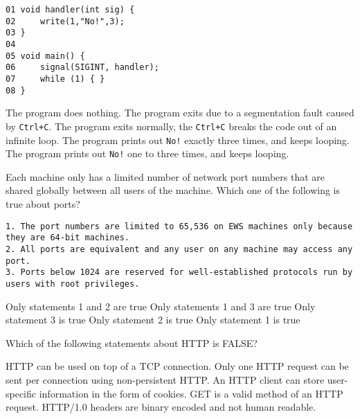 \begin{verbatim}
01 void handler(int sig) {
02     write(1,"No!",3);
03 }
04 
05 void main() {
06     signal(SIGINT, handler);
07     while (1) { }
08 }
\end{verbatim}

\begin{answers}

\answer The program does nothing.
\answer The program exits due to a segmentation fault caused by {\tt Ctrl+C}.
\answer The program exits normally, the {\tt Ctrl+C} breaks the code out of an infinite loop.
\answer The program prints out {\tt No!} exactly three times, and keeps looping.
\correctanswer The program prints out {\tt No!} one to three times, and keeps looping. 
\end{answers}
\begin{solution}
\end{solution}


\variant
Each machine only has a limited number of network port numbers that are shared globally between all users of the machine.  Which one of the following is true about ports?
\begin{verbatim}
1. The port numbers are limited to 65,536 on EWS machines only because they are 64-bit machines.
2. All ports are equivalent and any user on any machine may access any port.
3. Ports below 1024 are reserved for well-established protocols run by users with root privileges.
\end{verbatim}
\begin{answers}
\answer Only statements 1 and 2 are true
\answer Only statements 1 and 3 are true
\correctanswer Only statement 3 is true
\answer Only statement 2 is true
\answer Only statement 1 is true
\end{answers}
\begin{solution}
\end{solution}

\variant
 Which of the following statements about HTTP is FALSE?
\begin{answers}
\answer HTTP can be used on top of a TCP connection.
\answer Only one HTTP request can be sent per connection using non-persistent HTTP.
\answer An HTTP client can store user-specific information in the form of cookies.
\answer GET is a valid method of an HTTP request.
\correctanswer HTTP/1.0 headers are binary encoded and not human readable.
\end{answers}
\begin{solution}
\end{solution}

